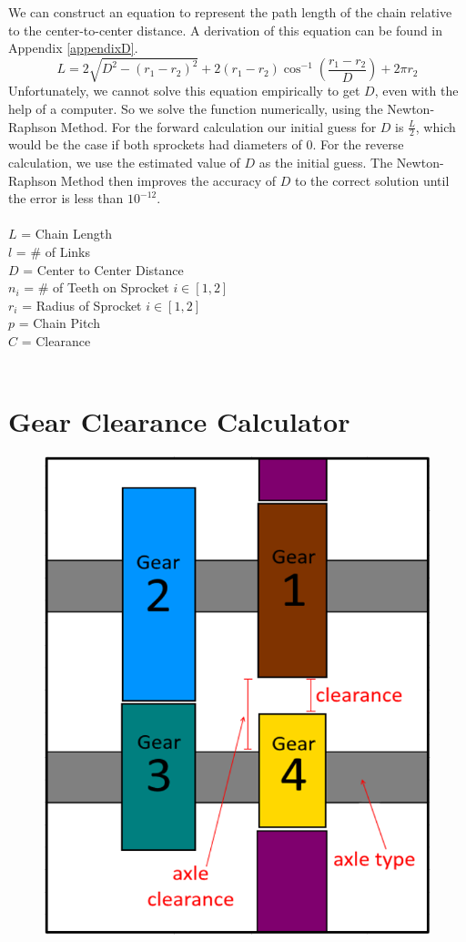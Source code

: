 \documentclass[11pt,a4paper,titlepage]{article}
\begin{document}
	We can construct an equation to represent the path length of the chain relative to the center-to-center distance. A derivation of this equation can be found in Appendix \ref{appendixD}.
	\begin{equation} \label{chain_len}
		L = 2 \sqrt{D^2 - (r_1 - r_2)^2} + 2 (r_1 - r_2) \cos^{-1} \left( \frac{r_1 - r_2}{D} \right) + 2 \pi r_2
	\end{equation}
	Unfortunately, we cannot solve this equation empirically to get $D$, even with the help of a computer. So we solve the function numerically, using the Newton-Raphson Method. For the forward calculation our initial guess for $D$ is $\frac{L}{2}$, which would be the case if both sprockets had diameters of 0. For the reverse calculation, we use the estimated value of $D$ as the initial guess. The Newton-Raphson Method then improves the accuracy of $D$ to the correct solution until the error is less than $10^{-12}$.\\ \\
	$L$ = Chain Length \\
	$l$ = \# of Links \\
	$D$ = Center to Center Distance \\
	$n_i$ = \# of Teeth on Sprocket $i \in [1,2]$ \\
	$r_i$ = Radius of Sprocket $i \in [1,2]$ \\
	$p$ = Chain Pitch \\
	$C$ = Clearance \\ \\
	
	\bigskip
	\section{Gear Clearance Calculator}
	\begin{figure}[H]
		\centering
		\includegraphics[width=0.4\linewidth]{Gear_Clear}
	\end{figure}
	
\end{document}
